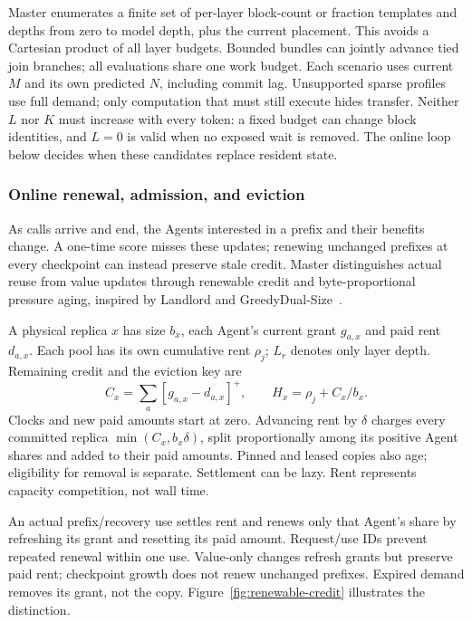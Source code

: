 Master enumerates a finite set of per-layer block-count or fraction
templates and depths from zero to model depth, plus the current placement.
This avoids a Cartesian product of all layer budgets. Bounded bundles
can jointly advance tied join branches; all evaluations share one work
budget. Each scenario uses current $M$ and its own predicted $N$,
including commit lag. Unsupported sparse profiles use full demand;
only computation that must still execute hides transfer.
Neither $L$ nor $K$ must increase with every token: a fixed budget can
change block identities, and $L=0$ is valid when no exposed wait is removed.
The online loop below decides when these candidates replace resident state.

\subsubsection{Online renewal, admission, and eviction}
\label{sec:placement-plan}

As calls arrive and end, the Agents interested in a prefix and their
benefits change. A one-time score misses these updates; renewing unchanged
prefixes at every checkpoint can instead preserve stale credit.
Master distinguishes actual reuse from value updates through renewable
credit and byte-proportional pressure aging, inspired by Landlord and
GreedyDual-Size~\cite{young2002landlord,cao1997greedydual}.

A physical replica $x$ has size $b_x$, each Agent's current grant $g_{a,x}$
and paid rent $d_{a,x}$. Each pool has its own cumulative rent $\rho_j$;
$L_r$ denotes only layer depth. Remaining credit and the eviction key are
\begin{equation}
 C_x=\sum_a[g_{a,x}-d_{a,x}]^+,
 \qquad H_x=\rho_j+C_x/b_x.
 \label{eq:rental-credit}
\end{equation}
Clocks and new paid amounts start at zero. Advancing rent by $\delta$
charges every committed replica $\min(C_x,b_x\delta)$, split proportionally
among its positive Agent shares and added to their paid amounts. Pinned
and leased copies also age; eligibility for removal is separate. Settlement
can be lazy. Rent represents capacity competition, not wall time.

An actual prefix/recovery use settles rent and renews only that Agent's
share by refreshing its grant and resetting its paid amount. Request/use
IDs prevent repeated renewal within one use. Value-only changes refresh
grants but preserve paid rent; checkpoint growth does not renew unchanged
prefixes. Expired demand removes its grant, not the copy. Figure~\ref{fig:renewable-credit}
illustrates the distinction.

